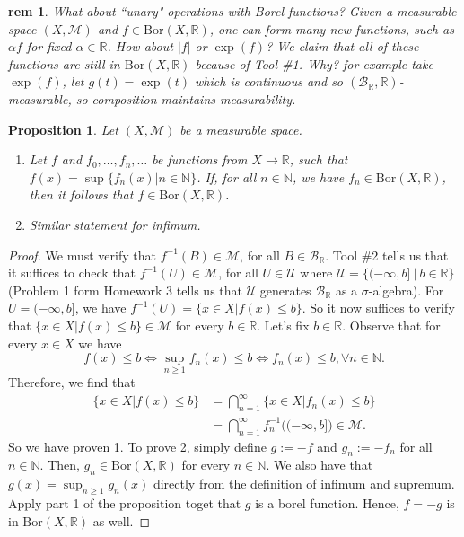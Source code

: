 \documentclass[letterpaper, 12pt]{article}
\newcommand{\fin}{\qquad \quad \hfill \framebox[1.75mm][l]{\,}}
\newcommand{\cU}{\mathcal{U}}
\newcommand{\cB}{\mathcal{B}}
\newcommand{\cM}{\mathcal{M}}
\newcommand{\bR}{\mathbb{R}}
\newcommand{\bN}{\mathbb{N}}
\theoremstyle{stdthm}
\newtheorem{prop}[thm]{Proposition}
\theoremstyle{stddef}
\newtheorem{rem}[thm]{rem} %
\theoremstyle{stdnonum}
\theoremstyle{stdqands}
\theoremstyle{stdbold}
\begin{document}
\begin{rem}
What about ``unary" operations with Borel functions? Given a measurable space $(X,\cM)$ and $f \in \mathrm{Bor}(X,\bR)$, one can form many new functions, such as $\alpha f$ for fixed $\alpha \in \bR$. How about $|f|$ or $\exp(f)$? We claim that all of these functions are still in $\mbox{Bor}(X,\bR)$ because of Tool \#1. Why? for example take $\exp(f)$, let $g(t) = \exp(t)$ which is continuous and so $(\cB_\bR, \bR)$-measurable, so composition maintains  measurability. 
\end{rem}

\begin{prop}
Let $(X,\cM)$ be a measurable space. 
\begin{enumerate}
\item Let $f$ and $f_0,\dots,f_n,\dots $ be functions from $X \rightarrow \bR$, such that $f(x) = \sup \{ f_n(x)| n \in \bN\}$. If, for all $n \in \bN$, we have $f_n \in \mathrm{Bor}(X,\bR)$, then it follows that $f \in \mathrm{Bor}(X,\bR)$. 
\item  Similar statement for infimum.
\end{enumerate}
\end{prop}

\begin{proof}
We must verify that $f^{-1}(B) \in \cM$, for all $B \in \cB_\bR$. Tool \#2 tells us that it suffices to check that $f^{-1}(U) \in \cM$, for all $U \in \cU$ where $\cU = \{(-\infty,b]\ |\ b \in \bR\}$ (Problem 1 form Homework 3 tells us that $\cU$ generates $\cB_\bR$ as a $\sigma$-algebra).  For $U = (-\infty, b]$, we have $f^{-1}(U) = \{x \in X| f(x) \leq b\}$. 
So it now suffices to verify that $\{x \in X|f(x) \leq b\} \in \cM$ for every $b \in \bR$. Let's fix $b \in \bR$. Observe that for every $x \in X$ we have 
\[
f(x) \leq b \Longleftrightarrow \sup_{n\geq 1} f_n(x) \leq b \Longleftrightarrow f_n(x) \leq b, \forall n \in \bN.
\]
Therefore, we find that 
\begin{align*}
 \{ x \in X|f(x) \leq b \} &= \bigcap_{n=1}^\infty \{x \in X|f_n(x) \leq b\}\\
 &= \bigcap_{n=1}^\infty f^{-1}_n\big((-\infty, b]\big) \in \cM.
\end{align*}
So we have proven 1.
To prove 2, simply define $g:= -f$ and $g_n := -f_n$ for all $n \in \bN$. Then, $g_n \in \mathrm{Bor}(X,\bR)$ for every $n \in \bN$. We also have that $g(x) = \sup_{n\geq 1} g_n(x)$ directly from the definition of infimum and supremum. Apply part 1 of the proposition toget that $g$ is a borel function. Hence, $f = -g$ is in $\mathrm{Bor}(X,\bR)$ as well. 
\end{proof}
\end{document}
